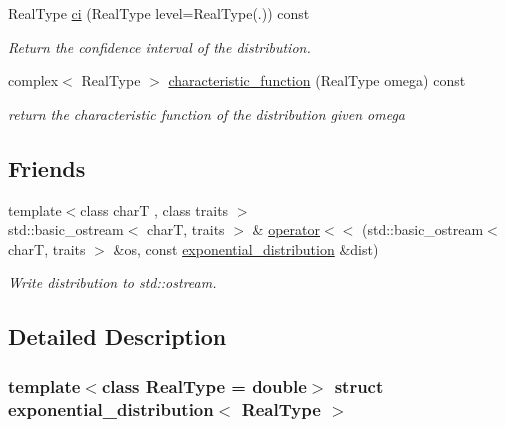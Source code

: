 \begin{DoxyCompactItemize}
\mbox{\label{structexponential__distribution_a82795203f013b479354e595a86a4e9c7}} 
Real\+Type \mbox{\hyperlink{structexponential__distribution_a82795203f013b479354e595a86a4e9c7}{ci}} (Real\+Type level=Real\+Type(.)) const
\begin{DoxyCompactList}\small\item\em Return the confidence interval of the distribution. \end{DoxyCompactList}\item 
\mbox{\label{structexponential__distribution_a2bf78de88b60b9a71773e7eed995f6af}} 
complex$<$ Real\+Type $>$ \mbox{\hyperlink{structexponential__distribution_a2bf78de88b60b9a71773e7eed995f6af}{characteristic\+\_\+function}} (Real\+Type omega) const
\begin{DoxyCompactList}\small\item\em return the characteristic function of the distribution given omega \end{DoxyCompactList}\end{DoxyCompactItemize}
\subsection*{Friends}
\begin{DoxyCompactItemize}
\item 
\mbox{\label{structexponential__distribution_a0acc132bb35454ce556d35528bdfe8f0}} 
{\footnotesize template$<$class charT , class traits $>$ }\\std\+::basic\+\_\+ostream$<$ charT, traits $>$ \& \mbox{\hyperlink{structexponential__distribution_a0acc132bb35454ce556d35528bdfe8f0}{operator$<$$<$}} (std\+::basic\+\_\+ostream$<$ charT, traits $>$ \&os, const \mbox{\hyperlink{structexponential__distribution}{exponential\+\_\+distribution}} \&dist)
\begin{DoxyCompactList}\small\item\em Write distribution to std\+::ostream. \end{DoxyCompactList}\end{DoxyCompactItemize}


\subsection{Detailed Description}
\subsubsection*{template$<$class Real\+Type = double$>$\newline
struct exponential\+\_\+distribution$<$ Real\+Type $>$}

